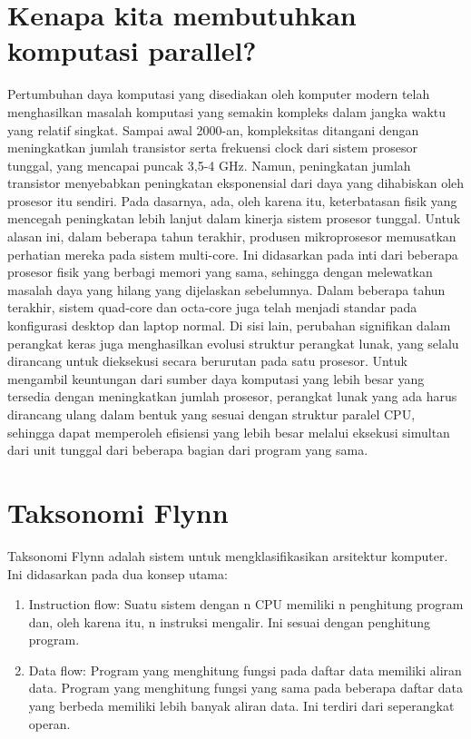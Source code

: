 \section{Kenapa kita membutuhkan komputasi parallel?}

Pertumbuhan daya komputasi yang disediakan oleh komputer modern telah menghasilkan masalah komputasi yang semakin kompleks dalam jangka waktu yang relatif singkat. Sampai awal 2000-an, kompleksitas ditangani dengan meningkatkan jumlah transistor serta frekuensi clock dari sistem prosesor tunggal, yang mencapai puncak 3,5-4 GHz. Namun, peningkatan jumlah transistor menyebabkan peningkatan eksponensial dari daya yang dihabiskan oleh prosesor itu sendiri. Pada dasarnya, ada, oleh karena itu, keterbatasan fisik yang mencegah peningkatan lebih lanjut dalam kinerja sistem prosesor tunggal.
\noindent
Untuk alasan ini, dalam beberapa tahun terakhir, produsen mikroprosesor memusatkan perhatian mereka pada sistem multi-core. Ini didasarkan pada inti dari beberapa prosesor fisik yang berbagi memori yang sama, sehingga dengan melewatkan masalah daya yang hilang yang dijelaskan sebelumnya. Dalam beberapa tahun terakhir, sistem quad-core dan octa-core juga telah menjadi standar pada konfigurasi desktop dan laptop normal.
\noindent
Di sisi lain, perubahan signifikan dalam perangkat keras juga menghasilkan evolusi struktur perangkat lunak, yang selalu dirancang untuk dieksekusi secara berurutan pada satu prosesor. Untuk mengambil keuntungan dari sumber daya komputasi yang lebih besar yang tersedia dengan meningkatkan jumlah prosesor, perangkat lunak yang ada harus dirancang ulang dalam bentuk yang sesuai dengan struktur paralel CPU, sehingga dapat memperoleh efisiensi yang lebih besar melalui eksekusi simultan dari unit tunggal dari beberapa bagian dari program yang sama.

\section{Taksonomi Flynn}
Taksonomi Flynn adalah sistem untuk mengklasifikasikan arsitektur komputer. Ini didasarkan pada dua konsep utama:

\begin{enumerate}
	\item Instruction flow: Suatu sistem dengan n CPU memiliki n penghitung program dan, oleh karena itu, n instruksi mengalir. Ini sesuai dengan penghitung program.
	\item Data flow: Program yang menghitung fungsi pada daftar data memiliki aliran data. Program yang menghitung fungsi yang sama pada beberapa daftar data yang berbeda memiliki lebih banyak aliran data. Ini terdiri dari seperangkat operan.
\end{enumerate}

